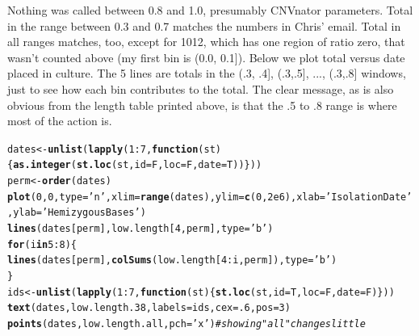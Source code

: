 \documentclass{article}\usepackage[]{graphicx}\usepackage[]{color}
\makeatletter
\newcommand{\hlnum}[1]{\textcolor[rgb]{0.686,0.059,0.569}{#1}}%
\newcommand{\hlstr}[1]{\textcolor[rgb]{0.192,0.494,0.8}{#1}}%
\newcommand{\hlcom}[1]{\textcolor[rgb]{0.678,0.584,0.686}{\textit{#1}}}%
\newcommand{\hlopt}[1]{\textcolor[rgb]{0,0,0}{#1}}%
\newcommand{\hlstd}[1]{\textcolor[rgb]{0.345,0.345,0.345}{#1}}%
\newcommand{\hlkwa}[1]{\textcolor[rgb]{0.161,0.373,0.58}{\textbf{#1}}}%
\newcommand{\hlkwb}[1]{\textcolor[rgb]{0.69,0.353,0.396}{#1}}%
\newcommand{\hlkwc}[1]{\textcolor[rgb]{0.333,0.667,0.333}{#1}}%
\newcommand{\hlkwd}[1]{\textcolor[rgb]{0.737,0.353,0.396}{\textbf{#1}}}%
\newenvironment{kframe}{%
 \def\at@end@of@kframe{}%
 \ifinner\ifhmode%
  \def\at@end@of@kframe{\end{minipage}}%
  \begin{minipage}{\columnwidth}%
 \fi\fi%
 \def\FrameCommand##1{\hskip\@totalleftmargin \hskip-\fboxsep
 \colorbox{shadecolor}{##1}\hskip-\fboxsep
     \hskip-\linewidth \hskip-\@totalleftmargin \hskip\columnwidth}%
 \MakeFramed {\advance\hsize-\width
   \@totalleftmargin\z@ \linewidth\hsize
   \@setminipage}}%
 {\par\unskip\endMakeFramed%
 \at@end@of@kframe}
\newenvironment{knitrout}{}{} %
\makeatother
\begin{document}
Nothing was called between 0.8 and 1.0, presumably CNVnator parameters.  Total in the range between 0.3 and 0.7 matches the numbers in Chris' email.  Total in all ranges matches, too, except for 1012, which has one region of ratio zero, that wasn't counted above (my first bin is (0.0, 0.1]).  Below we plot total versus date placed in culture.  The 5 lines are totals in the (.3, .4], (.3,.5], ..., (.3,.8] windows, just to see how each bin contributes to the total.  The clear message, as is also obvious from the length table printed above, is that the .5 to .8 range is where most of the action is.  

\begin{knitrout}\footnotesize
{}\color{fgcolor}\begin{kframe}
\begin{alltt}
\hlstd{dates} \hlkwb{<-} \hlkwd{unlist}\hlstd{(}\hlkwd{lapply}\hlstd{(}\hlnum{1}\hlopt{:}\hlnum{7}\hlstd{,}\hlkwa{function}\hlstd{(}\hlkwc{st}\hlstd{)\{}\hlkwd{as.integer}\hlstd{(}\hlkwd{st.loc}\hlstd{(st,}\hlkwc{id}\hlstd{=F,}\hlkwc{loc}\hlstd{=F,}\hlkwc{date}\hlstd{=T))\}))}
\hlstd{perm} \hlkwb{<-} \hlkwd{order}\hlstd{(dates)}
\hlkwd{plot}\hlstd{(}\hlnum{0}\hlstd{,}\hlnum{0}\hlstd{,}\hlkwc{type}\hlstd{=}\hlstr{'n'}\hlstd{,} \hlkwc{xlim}\hlstd{=}\hlkwd{range}\hlstd{(dates),} \hlkwc{ylim}\hlstd{=}\hlkwd{c}\hlstd{(}\hlnum{0}\hlstd{,}\hlnum{2e6}\hlstd{),} \hlkwc{xlab}\hlstd{=}\hlstr{'Isolation Date'}\hlstd{,} \hlkwc{ylab}\hlstd{=}\hlstr{'Hemizygous Bases'}\hlstd{)}
\hlkwd{lines}\hlstd{(dates[perm], low.length[}\hlnum{4}\hlstd{,perm],}\hlkwc{type}\hlstd{=}\hlstr{'b'}\hlstd{)}
\hlkwa{for}\hlstd{(i} \hlkwa{in} \hlnum{5}\hlopt{:}\hlnum{8}\hlstd{)\{}
  \hlkwd{lines}\hlstd{(dates[perm],} \hlkwd{colSums}\hlstd{(low.length[}\hlnum{4}\hlopt{:}\hlstd{i,perm]),}\hlkwc{type}\hlstd{=}\hlstr{'b'}\hlstd{)}
\hlstd{\}}
\hlstd{ids} \hlkwb{<-} \hlkwd{unlist}\hlstd{(}\hlkwd{lapply}\hlstd{(}\hlnum{1}\hlopt{:}\hlnum{7}\hlstd{,}\hlkwa{function}\hlstd{(}\hlkwc{st}\hlstd{)\{}\hlkwd{st.loc}\hlstd{(st,}\hlkwc{id}\hlstd{=T,}\hlkwc{loc}\hlstd{=F,}\hlkwc{date}\hlstd{=F)\}))}
\hlkwd{text}\hlstd{(dates, low.length.38,} \hlkwc{labels}\hlstd{=ids,}\hlkwc{cex}\hlstd{=}\hlnum{.6}\hlstd{,}\hlkwc{pos}\hlstd{=}\hlnum{3}\hlstd{)}
\hlkwd{points}\hlstd{(dates,low.length.all,}\hlkwc{pch}\hlstd{=}\hlstr{'x'}\hlstd{)}  \hlcom{# showing "all" changes little}
\end{alltt}
\end{kframe}


\end{knitrout}
\end{document}
